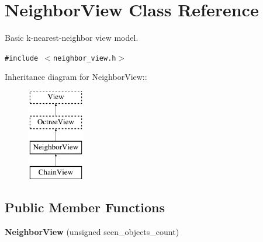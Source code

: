 \hypertarget{class_neighbor_view}{
\section{NeighborView Class Reference}
\label{class_neighbor_view}
}
Basic k-nearest-neighbor view model.  


{\tt \#include $<$neighbor\_\-view.h$>$}

Inheritance diagram for NeighborView::\begin{figure}[H]
\begin{center}
\leavevmode
\includegraphics[height=4cm]{class_neighbor_view}
\end{center}
\end{figure}
\subsection*{Public Member Functions}
\begin{CompactItemize}
\item 
\hypertarget{class_neighbor_view_ca4206dd5c6a4c50499c1cf95ef6fb7e}{
\textbf{NeighborView} (unsigned seen\_\-objects\_\-count)}
\label{class_neighbor_view_ca4206dd5c6a4c50499c1cf95ef6fb7e}

\end{CompactItemize}
